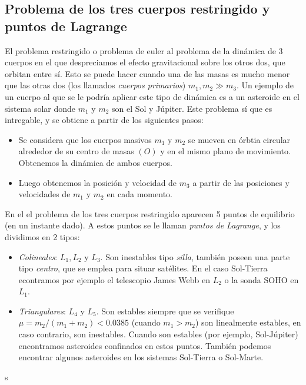 \subsection{Problema de los tres cuerpos restringido y puntos de Lagrange}

El problema restringido o problema de euler al problema de la dinámica de 3 cuerpos en el que despreciamos el efecto gravitacional sobre los otros dos, que orbitan entre sí. Esto se puede hacer cuando una de las masas es mucho menor que las otras dos (los llamados \textit{cuerpos primarios}) $m_1,m_2\gg m_3$. Un ejemplo de un cuerpo al que se le podría aplicar este tipo de dinámica es a un asteroide en el sistema solar donde $m_1$ y $m_2$ son el Sol y Júpiter. Este problema sí que es intregable, y se obtiene a partir de los siguientes pasos:

\begin{itemize}
    \item Se considera que los cuerpos masivos $m_1$ y $m_2$ se mueven en órbtia circular alrededor de su centro de masas $(O)$ y en el mismo plano de movimiento. Obtenemos la dinámica de ambos cuerpos.
    \item Luego obtenemos la posición y velocidad de $m_3$ a partir de las posiciones y velocidades de $m_1$ y $m_2$ en cada momento.
\end{itemize}
En el el problema de los tres cuerpos restringido aparecen 5 puntos de equilibrio (en un instante dado). A estos puntos se le llaman \textit{puntos de Lagrange}, y los dividimos en 2 tipos:

\begin{itemize}
    \item \textit{Colineales}: $L_1,L_2$ y $L_3$. Son inestables tipo \textit{silla}, también poseen una parte tipo \textit{centro}, que se emplea para situar satélites. En el caso Sol-Tierra econtramos por ejemplo el telescopio James Webb en $L_2$ o la sonda SOHO en $L_1$.
    \item \textit{Triangulares}: $L_4$ y $L_5$. Son estables siempre que se verifique $\mu=m_2/(m_1+m_2)<0.0385$ (cuando $m_1>m_2$) son linealmente estables, en caso contrario, son inestables. Cuando son estables (por ejemplo, Sol-Júpiter) encontramos asteroides confinados en estos puntos. También podemos encontrar algunos asteroides en los sistemas Sol-Tierra o Sol-Marte.
\end{itemize}
s





